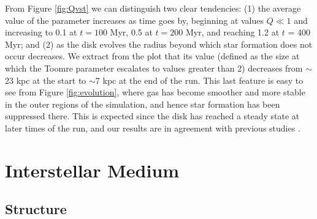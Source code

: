 \documentclass[twocolumn]{aastex}
\begin{document}
From Figure \ref{fig:Qvst} we can distinguish two clear tendencies: (1) the average value of the parameter increases as time goes by, beginning at values $Q \ll 1$ and increasing to 0.1 at $t = 100$ Myr, 0.5 at $t = 200$ Myr, and reaching 1.2 at $t$ = 400 Myr; and (2) as the disk evolves the radius beyond which star formation does not occur decreases. We extract from the plot that its value (defined as the size at which the Toomre parameter escalates to values greater than 2) decreases from $\sim$23 kpc at the start to $\sim$7 kpc at the end of the run. This last feature is easy to see from Figure \ref{fig:evolution}, where gas has become smoother and more stable in the outer regions of the simulation, and hence star formation has been suppressed there. This is expected since the disk has reached a steady state at later times of the run, and our results are in agreement with previous studies \citep{Wada_99, Wada_01}.

\section{Interstellar Medium}
\label{sec:ISM}

\subsection{Structure}
\label{subsec:structure}
\end{document}
